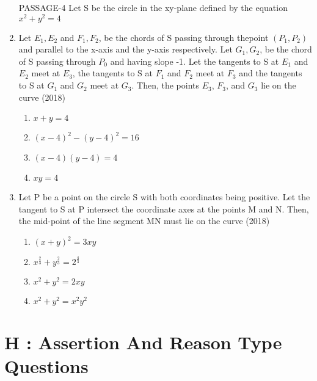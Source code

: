 \documentclass[12pt]{article}
\begin{document}
\begin{enumerate}
PASSAGE-4
Let S be the circle in the xy-plane defined by the equation $x^2+y^2=4$
\item Let $E_1,E_2$ and $F_1,F_2$, be the chords of S passing through thepoint $(P_1,P_2)$ and parallel to the x-axis and the y-axis respectively. Let $G_1,G_2$, be the chord of S passing through $P_0$ and having slope -1. Let the tangents to S at $E_1$ and $E_2$ meet at $E_3$, the tangents to S at $F_1$ and $F_2$ meet at $F_3$ and the tangents to S at $G_1$ and $G_2$ meet at $G_3$. Then, the points $E_3$, $F_3$, and $G_3$ lie on the curve (2018)
\begin{enumerate}
\item $x+y=4$
\item $(x-4)^2-(y-4)^2=16$
\item $(x-4)(y-4)=4$
\item $xy=4$
\end{enumerate}
\item Let P be a point on the circle S with both coordinates being positive. Let the tangent to S at P intersect the coordinate axes at the points M and N. Then, the mid-point of the line segment MN must lie on the curve (2018)
\begin{enumerate}
\item $(x+y)^2=3xy$
\item $x^\frac{2}{3}+y^\frac{2}{3}=2^\frac{4}{3}$
\item $x^2+y^2=2xy$
\item $x^2+y^2=x^2y^2$
\end{enumerate}

\end{enumerate}

\section*{H   :  Assertion And Reason Type Questions}
\end{document}
